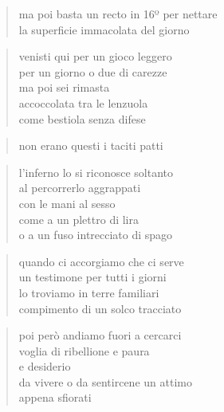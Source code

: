 	\begin{verse}
		ma poi basta un recto in 16º per nettare\\
		la superficie immacolata del giorno
	\end{verse}

\clearpage


\vspace*{2cm}

	\begin{verse}
		venisti qui per un gioco leggero\\
		per un giorno o due di carezze\\
		ma poi sei rimasta\\
		accoccolata tra le lenzuola\\
		come bestiola senza difese
	\end{verse}

	\begin{verse}
		non erano questi i taciti patti
	\end{verse}

\clearpage


\vspace*{2cm}

	\begin{verse}
		l'inferno lo si riconosce soltanto\\
		al percorrerlo aggrappati\\
		con le mani al sesso\\
		come a un plettro di lira\\
		o a un fuso intrecciato di spago
	\end{verse}

\clearpage


\vspace*{2cm}

	\begin{verse}
		quando ci accorgiamo che ci serve\\
		un testimone per tutti i giorni\\
		lo troviamo in terre familiari\\
		compimento di un solco tracciato
	\end{verse}

	\begin{verse}
		poi però andiamo fuori a cercarci\\
		voglia di ribellione e paura\\
		e desiderio\\
		da vivere o da sentircene un attimo\\
		appena sfiorati
	\end{verse}

